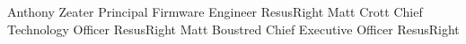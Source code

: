 %
%
%


\begin{referees}
		{Anthony Zeater}
		{Principal Firmware Engineer}
		{ResusRight}
		{}
		{Matt Crott}
		{Chief Technology Officer}
		{ResusRight}
		{}
		{Matt Boustred}
		{Chief Executive Officer}
		{ResusRight}
		{}
\end{referees}